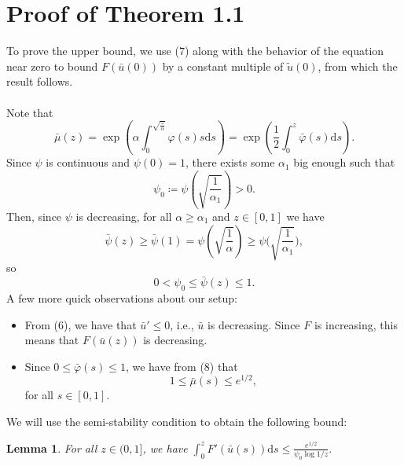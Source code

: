\documentclass{article}
\newtheorem{lem}[thm]{Lemma}
\begin{document}
\section{Proof of Theorem 1.1} 
To prove the upper bound, we use (7) along with the behavior of the equation near zero to bound $F(\bar u(0))$ by a constant multiple of $\tilde{u}(0)$, from which the result follows. \\ \\
Note that
\begin{equation}
    \bar\mu(z) = \exp\left(\alpha\int_0^{\sqrt{\frac z{\alpha}}}\varphi(s)s\mathrm{d}s\right) = \exp\left(\frac 12\int_0^z \bar\varphi(s)\mathrm{d}s\right).
\end{equation}
Since $\psi$ is continuous and $\psi(0) = 1$, there exists some $\alpha_1$ big enough such that
\[\psi_0\coloneqq \psi\left(\sqrt{\frac1{\alpha_1}}\right) > 0.\]
Then, since $\psi$ is decreasing, for all $\alpha \geq \alpha_1$ and $z\in[0,1]$ we have
\[ \bar\psi(z)\geq\bar\psi(1)=\psi\left(\sqrt{\frac1\alpha}\right)\geq\psi\Bigg(\sqrt{\frac1{\alpha_1}}\Bigg),
\]
so
\begin{equation}
    0 < \psi_0 \leq \bar\psi(z)\leq 1.
\end{equation}
A few more quick observations about our setup:
\begin{itemize}
    \item From (6), we have that $\bar u' \leq 0$, i.e., $\bar u$ is decreasing. Since $F$ is increasing, this means that $F(\bar u(z))$ is decreasing.
    \item Since $0\leq \bar\varphi(s) \leq 1$, we have from (8) that
    \begin{equation}
        1\leq \bar\mu(s)\leq e^{1/2},
    \end{equation}
    for all $s\in[0,1]$.
\end{itemize}
We will use the semi-stability condition to obtain the following bound:
\begin{lem}
    For all $z\in(0,1]$, we have $\int_0^z F'(\bar u(s))\mathrm{d}s\leq \frac {e^{1/2}}{\psi_0\log 1/z}.$
\end{lem}
\end{document}
